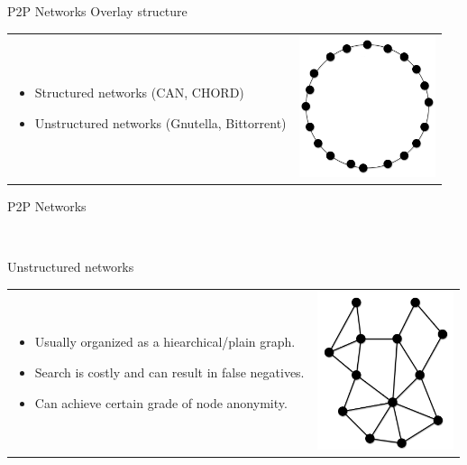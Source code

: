 \documentclass[12pt]{beamer}
\renewcommand{\frametitle}[1]{\vspace{0.2cm}\begin{huge}#1\end{huge}}
\renewcommand{\framesubtitle}[1]{\\ \vspace{0.4cm} \hspace{0.4cm}\begin{large}#1\end{large}}
\begin{document}
    \begin{frame}
    \frametitle{P2P Networks Overlay structure}
    \begin{table}
    \begin{tabular}{p{7cm}p{3cm}}
    \begin{itemize}
        \item Structured networks (CAN, CHORD)
        \item Unstructured networks (Gnutella, Bittorrent)
    \end{itemize}
    &
    \vspace{1.5cm}
    \includegraphics[width=4cm]{../../presentacion/img/p2p-structured}\\
    \end{tabular}
    \end{table}
    \end{frame}

    \begin{frame}
    \frametitle{P2P Networks}
    \framesubtitle{Unstructured networks}
    \begin{table}
    \begin{tabular}{p{7cm}p{3cm}}
    \begin{itemize}
        \item Usually organized as a hiearchical/plain graph.
        \item Search is costly and can result in false negatives.
        \item Can achieve certain grade of node anonymity. 
    \end{itemize}
    &
    \vspace{1.5cm}
    \includegraphics[width=4cm]{../../presentacion/img/p2p-unstructured}\\
    \end{tabular}
    \end{table}
    \end{frame}
\end{document}
